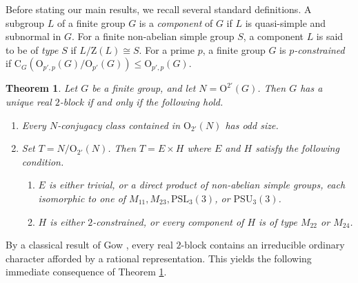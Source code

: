 \documentclass[10pt]{article}
\newtheorem{mainthm}{Theorem}
\begin{document}
Before stating our main results, we recall several standard definitions.
A subgroup $L$ of a finite group $G$ is a \emph{component} of $G$ if $L$ is quasi-simple and subnormal in $G$. 
For a finite non-abelian simple group $S$, a component $L$ is said to be of \emph{type} $S$ if $L/\mathrm{Z}(L)\cong S$. For a prime $p$, a finite group $G$ is \emph{$p$-constrained} if $\mathrm{C}_{G}(\mathrm{O}_{p',p}(G)/\mathrm{O}_{p'}(G))\leq \mathrm{O}_{p',p}(G)$.





\begin{mainthm}\label{thmA}
	Let $G$ be a finite group, and let $N=\mathrm{O}^{2'}(G)$.
  Then $G$ has a unique real $2$-block if and only if 
  the following hold.
  \begin{enumerate}[\rm (1)]
    			\item  Every $N$-conjugacy class contained in $\mathrm{O}_{2'}(N)$ has odd size. 
     \item Set $T=N/\mathrm{O}_{2'}(N)$. 
     Then $T=E\times H$ where $E$ and $H$ satisfy the following condition.
     \begin{enumerate}[\rm (i)]
      \item $E$ is either trivial, or a direct product of non-abelian simple groups,
      each isomorphic to one of $M_{11}, M_{23}, \mathrm{PSL}_3(3)$, or $\mathrm{PSU}_3(3)$.
\item $H$ is either $2$-constrained, or every component of $H$ is 
    of type $M_{22}$ or $M_{24}$.
     \end{enumerate}
  \end{enumerate}
\end{mainthm}



By a classical result of Gow \cite[Theorem 5.1]{gow79}, every real $2$-block contains an irreducible ordinary character
afforded by a rational representation.
 This yields the following immediate consequence of Theorem \ref{thmA}.
\end{document}
